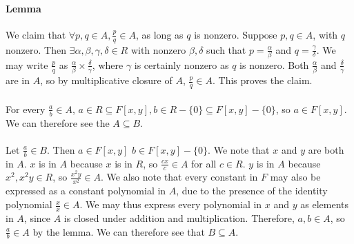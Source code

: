 \documentclass[]{article}
\begin{document}
	\paragraph{Lemma}
	We claim that $\forall p, q \in A, \frac{p}{q} \in A$, as long as $q$ is nonzero.\newline
	Suppose $p, q \in A$, with $q$ nonzero.\newline
	Then $\exists \alpha, \beta, \gamma, \delta \in R$ with nonzero $\beta, \delta$ such that $p = \frac{\alpha}{\beta}$ and $q = \frac{\gamma}{\delta}$.\newline
	We may write $\frac{p}{q}$ as $\frac{\alpha}{\beta} \times  \frac{\delta}{\gamma}$, where $\gamma$ is certainly nonzero as $q$ is nonzero.\newline
	Both $\frac{\alpha}{\beta}$ and $\frac{\delta}{\gamma}$ are in $A$, so by multiplicative closure of $A$, $\frac{p}{q} \in A$.\newline
	This proves the claim.
	
	\paragraph{}
	For every $\frac{a}{b} \in A$, $a \in R \subseteq F[x,y], b \in R - \{0\} \subseteq F[x,y] - \{0\}$, so $a \in F[x,y]$.\newline
	We can therefore see the $A \subseteq B$.\newline
	
	\paragraph{}
	Let $\frac{a}{b} \in B$. Then $a \in F[x,y]$ $b \in F[x,y] - \{0\}$.\newline
	We note that $x$ and $y$ are both in $A$. $x$ is in $A$ because $x$ is in $R$, so $\frac{cx}{c} \in A$ for all $c \in R$. $y$ is in $A$ because $x^2, x^2y \in R$, so $\frac{x^2y}{x^2} \in A$.\newline
	We also note that every constant in $F$ may also be expressed as a constant polynomial in $A$, due to the presence of the identity polynomial $\frac{x}{x} \in A$.\newline
	We may thus express every polynomial in $x$ and $y$ as elements in $A$, since $A$ is closed under addition and multiplication.\newline
	Therefore, $a, b \in A$, so $\frac{a}{b} \in A$ by the lemma.\newline
	We can therefore see that $B \subseteq A$.
	
\end{document}
